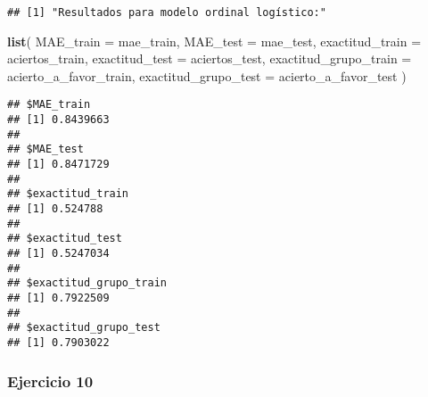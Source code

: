 \documentclass[
]{article}
\newenvironment{Shaded}{\begin{snugshade}}{\end{snugshade}}
\newcommand{\AttributeTok}[1]{\textcolor[rgb]{0.13,0.29,0.53}{#1}}
\newcommand{\FunctionTok}[1]{\textcolor[rgb]{0.13,0.29,0.53}{\textbf{#1}}}
\newcommand{\NormalTok}[1]{#1}
\begin{document}
\begin{verbatim}
## [1] "Resultados para modelo ordinal logístico:"
\end{verbatim}

\begin{Shaded}
\begin{Highlighting}[]
\FunctionTok{list}\NormalTok{(}
  \AttributeTok{MAE\_train =}\NormalTok{ mae\_train,}
  \AttributeTok{MAE\_test =}\NormalTok{ mae\_test,}
  \AttributeTok{exactitud\_train =}\NormalTok{ aciertos\_train,}
  \AttributeTok{exactitud\_test =}\NormalTok{ aciertos\_test,}
  \AttributeTok{exactitud\_grupo\_train =}\NormalTok{ acierto\_a\_favor\_train,}
  \AttributeTok{exactitud\_grupo\_test =}\NormalTok{ acierto\_a\_favor\_test}
\NormalTok{)}
\end{Highlighting}
\end{Shaded}

\begin{verbatim}
## $MAE_train
## [1] 0.8439663
## 
## $MAE_test
## [1] 0.8471729
## 
## $exactitud_train
## [1] 0.524788
## 
## $exactitud_test
## [1] 0.5247034
## 
## $exactitud_grupo_train
## [1] 0.7922509
## 
## $exactitud_grupo_test
## [1] 0.7903022
\end{verbatim}

\subsubsection{Ejercicio 10}\label{ejercicio-10}
\end{document}
